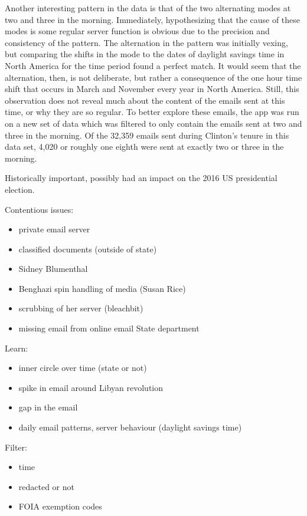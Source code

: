 \documentclass[journal]{vgtc}                %
\begin{document}
Another interesting pattern in the data is that of the two alternating modes at two and three in the morning. Immediately, hypothesizing that the cause of these modes is some regular server function is obvious due to the precision and consistency of the pattern. The alternation in the pattern was initially vexing, but comparing the shifts in the mode to the dates of daylight savings time in North America for the time period found a perfect match. It would seem that the alternation, then, is not deliberate, but rather a consequence of the one hour time shift that occurs in March and November every year in North America. Still, this observation does not reveal much about the content of the emails sent at this time, or why they are so regular. To better explore these emails, the app was run on a new set of data which was filtered to only contain the emails sent at two and three in the morning. Of the 32,359 emails sent during Clinton's tenure in this data set, 4,020 or roughly one eighth were sent at exactly two or three in the morning.

Historically important,  possibly had an impact on the 2016 US presidential election.

Contentious issues:
\begin{itemize}
\item private email server
\item classified documents (outside of state)
\item Sidney Blumenthal
\item Benghazi spin handling of media (Susan Rice)

\item scrubbing of her server (bleachbit)
\item missing email from online email State department
\end{itemize}


Learn:
\begin{itemize}
\item inner circle over time (state or not)
\item spike in email around Libyan revolution
\item gap in the email
\item daily email patterns, server behaviour (daylight savings time)
\end{itemize}

  
 Filter:
\begin{itemize}
\item time
\item redacted or not
\item FOIA exemption codes
\end{itemize}
\end{document}
